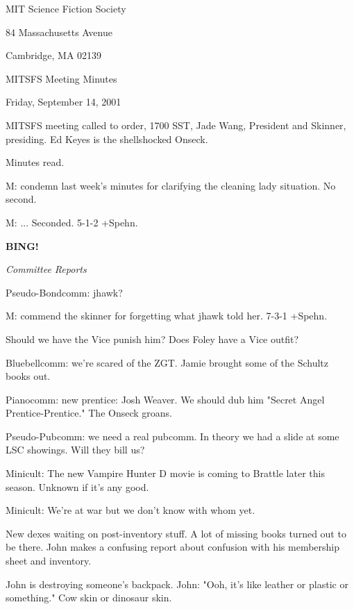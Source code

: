 \documentclass[12pt]{article}
\newcommand{\bing}{{\bf BING!} }
\newcommand{\goto}[1]{\bing \vskip 12pt \centerline{{\em{#1}}}}
\begin{document}
\begin{center}

MIT Science Fiction Society 

84 Massachusetts Avenue

Cambridge, MA 02139

\vspace{12pt}

MITSFS Meeting Minutes 

Friday, September 14, 2001

\end{center}
 
\vspace{18pt}

\setlength{\parskip}{6pt}

\noindent
MITSFS meeting called to order, 1700 SST, Jade Wang, President and
Skinner, presiding.  Ed Keyes is the shellshocked Onseck.

Minutes read.

M: condemn last week's minutes for clarifying the cleaning lady situation. No second.

M: ... Seconded. 5-1-2 +Spehn.

\goto{Committee Reports}

Pseudo-Bondcomm: jhawk?

M: commend the skinner for forgetting what jhawk told her. 7-3-1 +Spehn.

Should we have the Vice punish him? Does Foley have a Vice outfit?

Bluebellcomm: we're scared of the ZGT. Jamie brought some of the Schultz books out.

Pianocomm: new prentice: Josh Weaver. We should dub him "Secret Angel Prentice-Prentice." The Onseck groans.

Pseudo-Pubcomm: we need a real pubcomm. In theory we had a slide at some LSC showings. Will they bill us?

Minicult: The new Vampire Hunter D movie is coming to Brattle later this season. Unknown if it's any good.

Minicult: We're at war but we don't know with whom yet.

New dexes waiting on post-inventory stuff. A lot of missing books turned out to be there. John makes a confusing report about confusion with his membership sheet and inventory.

John is destroying someone's backpack. John: "Ooh, it's like leather or plastic or something." Cow skin or dinosaur skin.
\end{document}
